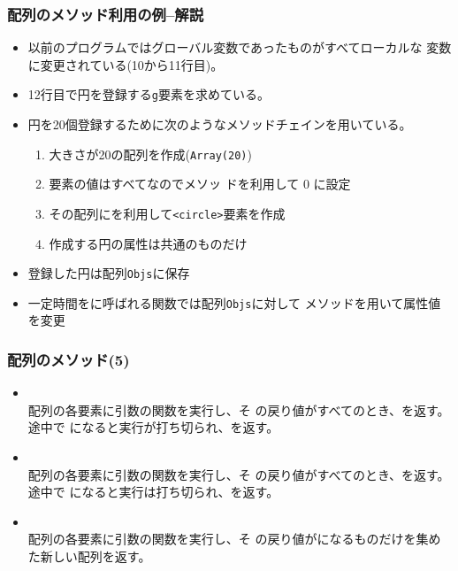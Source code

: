 \begin{frame}[containsverbatim]
 \frametitle{配列のメソッド利用の例--解説}
\begin{itemize}
 \item 以前のプログラムではグローバル変数であったものがすべてローカルな
			 変数に変更されている(10から11行目)。
 \item 12行目で円を登録する\texttt{g}要素を求めている。
 \item 円を20個登録するために次のようなメソッドチェインを用いている。
			 \begin{enumerate}
				\item 大きさが20の配列を作成(\texttt{Array(20)})
				\item 要素の値はすべてなのでメソッ
							ドを利用して 0 に設定
				\item その配列にを利用して\texttt{<circle>}要素を作成
				\item 作成する円の属性は共通のものだけ
			 \end{enumerate}
 \item 登録した円は配列\texttt{Objs}に保存
 \item 一定時間をに呼ばれる関数では配列\texttt{Objs}に対して
			 メソッドを用いて属性値を変更
\end{itemize}
\end{frame}
\begin{frame}[containsverbatim]
 \frametitle{配列のメソッド(5)}
\begin{itemize}
 \item {}\\配列の各要素に引数の関数を実行し、そ
       の戻り値がすべてのとき、を返す。途中で
       になると実行が打ち切られ、を返す。
 \item {}\\配列の各要素に引数の関数を実行し、そ
       の戻り値がすべてのとき、を返す。途中で
       になると実行は打ち切られ、を返す。
 \item {}\\配列の各要素に引数の関数を実行し、そ
       の戻り値がになるものだけを集めた新しい配列を返す。
\end{itemize} 
\end{frame}
